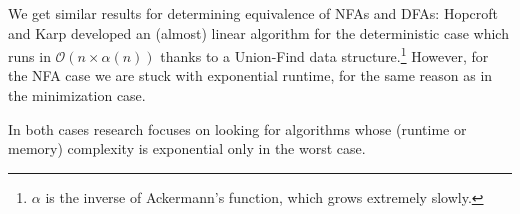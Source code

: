 We get similar results for determining equivalence of NFAs and DFAs:
Hopcroft and Karp developed an (almost) linear algorithm for the deterministic
case which runs in $\mathcal{O}(n \times \alpha(n))$ thanks to a
Union-Find data structure.\footnote{$\alpha$ is the inverse of Ackermann's
function, which grows extremely slowly.}
However, for the NFA case we are stuck with exponential runtime, for the same
reason as in the minimization case.

In both cases research focuses on looking for algorithms whose
(runtime or memory) complexity is exponential only in the worst case.
